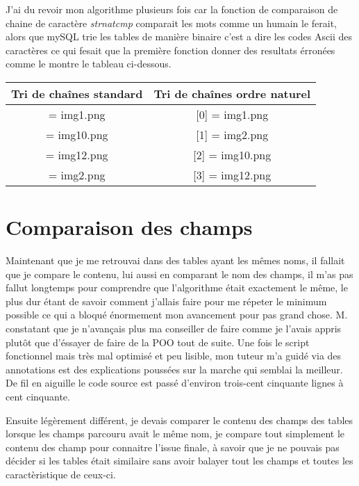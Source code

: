 J'ai du revoir mon algorithme plusieurs fois car la fonction de comparaison de
chaine de caractère \emph{strnatcmp} comparait les mots comme un humain le
ferait, alors que mySQL trie les tables de manière binaire c'est a dire les
codes Ascii des caractères ce qui fesait que la première fonction donner des
resultats érronées comme le montre le tableau ci-dessous.

\begin{center}
\begin{tabular}{|c|c|}
\hline
\textbf{Tri de chaînes standard} & \textbf{Tri de chaînes ordre naturel} \\
\hline
[0] = img1.png & [0] = img1.png \\
\hline
[1] = img10.png & [1] = img2.png \\
\hline
[2] = img12.png & [2] = img10.png \\
\hline
[3] = img2.png & [3] = img12.png \\
\hline
\end{tabular}
\end{center}

\section{Comparaison des champs}

Maintenant que je me retrouvai dans des tables ayant les mêmes noms, il fallait
que je compare le contenu, lui aussi en comparant le nom des champs, il m'as
pas fallut longtemps pour comprendre que l'algorithme était exactement le même,
le plus dur étant de savoir comment j'allais faire pour me répeter le minimum
possible ce qui a bloqué énormement mon avancement pour pas grand chose.
M. constatant que je n'avançais plus ma conseiller de faire comme
je l'avais appris plutôt que d'éssayer de faire de la POO tout de suite. Une
fois le script fonctionnel mais très mal optimisé et peu lisible, mon tuteur
m'a guidé via des annotations est des explications poussées sur la marche qui
semblai la meilleur. De fil en aiguille le code source est passé d'environ
trois-cent cinquante lignes à cent cinquante.

Ensuite légèrement différent, je devais comparer le contenu des champs des
tables lorsque les champs parcouru avait le même nom, je compare tout
simplement le contenu des champ pour connaitre l'issue finale, à savoir que je
ne pouvais pas décider si les tables était similaire sans avoir balayer tout
les champs et toutes les caractèristique de ceux-ci.

